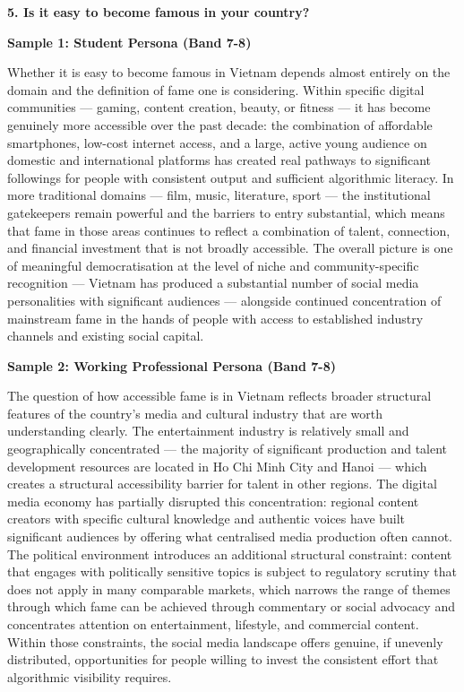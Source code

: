 \separator

\begin{ieltsquestion}
\textbf{5. Is it easy to become famous in your country?}
\end{ieltsquestion}
\textbf{Sample 1: Student Persona (Band 7-8)}

Whether it is easy to become famous in Vietnam depends almost entirely on the domain and the definition of fame one is considering. Within specific digital communities — gaming, content creation, beauty, or fitness — it has become genuinely more accessible over the past decade: the combination of affordable smartphones, low-cost internet access, and a large, active young audience on domestic and international platforms has created real pathways to significant followings for people with consistent output and sufficient algorithmic literacy. In more traditional domains — film, music, literature, sport — the institutional gatekeepers remain powerful and the barriers to entry substantial, which means that fame in those areas continues to reflect a combination of talent, connection, and financial investment that is not broadly accessible. The overall picture is one of meaningful democratisation at the level of niche and community-specific recognition — Vietnam has produced a substantial number of social media personalities with significant audiences — alongside continued concentration of mainstream fame in the hands of people with access to established industry channels and existing social capital.

\textbf{Sample 2: Working Professional Persona (Band 7-8)}

The question of how accessible fame is in Vietnam reflects broader structural features of the country's media and cultural industry that are worth understanding clearly. The entertainment industry is relatively small and geographically concentrated — the majority of significant production and talent development resources are located in Ho Chi Minh City and Hanoi — which creates a structural accessibility barrier for talent in other regions. The digital media economy has partially disrupted this concentration: regional content creators with specific cultural knowledge and authentic voices have built significant audiences by offering what centralised media production often cannot. The political environment introduces an additional structural constraint: content that engages with politically sensitive topics is subject to regulatory scrutiny that does not apply in many comparable markets, which narrows the range of themes through which fame can be achieved through commentary or social advocacy and concentrates attention on entertainment, lifestyle, and commercial content. Within those constraints, the social media landscape offers genuine, if unevenly distributed, opportunities for people willing to invest the consistent effort that algorithmic visibility requires.

